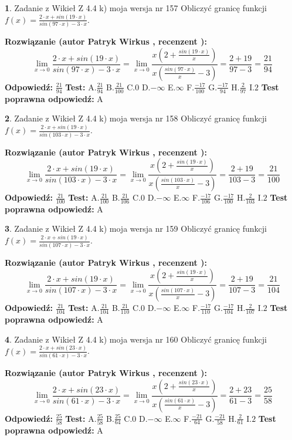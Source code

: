 \documentclass[12pt, a4paper]{article}
\theoremstyle{definition} %
\newtheorem{zad}{}
\newcommand{\zadStart}[1]{\begin{zad}#1\newline}
\newcommand{\zadStop}{\end{zad}}
\newcommand{\rozwStart}[2]{\noindent \textbf{Rozwiązanie (autor #1 , recenzent #2): }\newline}
\newcommand{\rozwStop}{\newline}
\newcommand{\odpStart}{\noindent \textbf{Odpowiedź:}\newline}
\newcommand{\odpStop}{\newline}
\newcommand{\testStart}{\noindent \textbf{Test:}\newline}
\newcommand{\testStop}{\newline}
\newcommand{\kluczStart}{\noindent \textbf{Test poprawna odpowiedź:}\newline}
\newcommand{\kluczStop}{\newline}
\begin{document}
\zadStart{Zadanie z Wikieł Z 4.4 k) moja wersja nr 157}
Obliczyć granicę funkcji $f(x)=\frac{2\cdot x +sin(19\cdot x)}{sin(97\cdot x) -3\cdot x}$.
\zadStop
\rozwStart{Patryk Wirkus}{}
$$\lim\limits_{x\to 0}\frac{2\cdot x +sin(19\cdot x)}{sin(97\cdot x) -3\cdot x}
=\lim\limits_{x\to 0}\frac{x(2+\frac{sin(19\cdot x)}{x})}{x(\frac{sin(97\cdot x)}{x}-3)}
=\frac{2+19}{97-3} = \frac{21}{94}$$
\rozwStop
\odpStart
$\frac{21}{94}$
\odpStop
\testStart
A.$\frac{21}{94}$
B.$\frac{21}{100}$
C.$0$
D.$-\infty$
E.$\infty$
F.$\frac{-17}{100}$
G.$\frac{-17}{94}$
H.$\frac{2}{97}$
I.$2$
\testStop
\kluczStart
A
\kluczStop



\zadStart{Zadanie z Wikieł Z 4.4 k) moja wersja nr 158}
Obliczyć granicę funkcji $f(x)=\frac{2\cdot x +sin(19\cdot x)}{sin(103\cdot x) -3\cdot x}$.
\zadStop
\rozwStart{Patryk Wirkus}{}
$$\lim\limits_{x\to 0}\frac{2\cdot x +sin(19\cdot x)}{sin(103\cdot x) -3\cdot x}
=\lim\limits_{x\to 0}\frac{x(2+\frac{sin(19\cdot x)}{x})}{x(\frac{sin(103\cdot x)}{x}-3)}
=\frac{2+19}{103-3} = \frac{21}{100}$$
\rozwStop
\odpStart
$\frac{21}{100}$
\odpStop
\testStart
A.$\frac{21}{100}$
B.$\frac{21}{106}$
C.$0$
D.$-\infty$
E.$\infty$
F.$\frac{-17}{106}$
G.$\frac{-17}{100}$
H.$\frac{2}{103}$
I.$2$
\testStop
\kluczStart
A
\kluczStop



\zadStart{Zadanie z Wikieł Z 4.4 k) moja wersja nr 159}
Obliczyć granicę funkcji $f(x)=\frac{2\cdot x +sin(19\cdot x)}{sin(107\cdot x) -3\cdot x}$.
\zadStop
\rozwStart{Patryk Wirkus}{}
$$\lim\limits_{x\to 0}\frac{2\cdot x +sin(19\cdot x)}{sin(107\cdot x) -3\cdot x}
=\lim\limits_{x\to 0}\frac{x(2+\frac{sin(19\cdot x)}{x})}{x(\frac{sin(107\cdot x)}{x}-3)}
=\frac{2+19}{107-3} = \frac{21}{104}$$
\rozwStop
\odpStart
$\frac{21}{104}$
\odpStop
\testStart
A.$\frac{21}{104}$
B.$\frac{21}{110}$
C.$0$
D.$-\infty$
E.$\infty$
F.$\frac{-17}{110}$
G.$\frac{-17}{104}$
H.$\frac{2}{107}$
I.$2$
\testStop
\kluczStart
A
\kluczStop



\zadStart{Zadanie z Wikieł Z 4.4 k) moja wersja nr 160}
Obliczyć granicę funkcji $f(x)=\frac{2\cdot x +sin(23\cdot x)}{sin(61\cdot x) -3\cdot x}$.
\zadStop
\rozwStart{Patryk Wirkus}{}
$$\lim\limits_{x\to 0}\frac{2\cdot x +sin(23\cdot x)}{sin(61\cdot x) -3\cdot x}
=\lim\limits_{x\to 0}\frac{x(2+\frac{sin(23\cdot x)}{x})}{x(\frac{sin(61\cdot x)}{x}-3)}
=\frac{2+23}{61-3} = \frac{25}{58}$$
\rozwStop
\odpStart
$\frac{25}{58}$
\odpStop
\testStart
A.$\frac{25}{58}$
B.$\frac{25}{64}$
C.$0$
D.$-\infty$
E.$\infty$
F.$\frac{-21}{64}$
G.$\frac{-21}{58}$
H.$\frac{2}{61}$
I.$2$
\testStop
\kluczStart
A
\kluczStop
\end{document}
